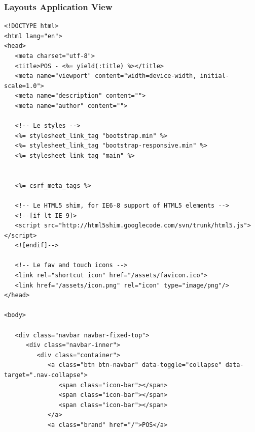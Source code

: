 \documentclass[a4paper]{article}
\begin{document}
\subsubsection{Layouts Application View}
\begin{verbatim}
<!DOCTYPE html>
<html lang="en">
<head>
   <meta charset="utf-8">
   <title>POS - <%= yield(:title) %></title>
   <meta name="viewport" content="width=device-width, initial-scale=1.0">
   <meta name="description" content="">
   <meta name="author" content="">

   <!-- Le styles -->
   <%= stylesheet_link_tag "bootstrap.min" %>
   <%= stylesheet_link_tag "bootstrap-responsive.min" %>
   <%= stylesheet_link_tag "main" %>


   <%= csrf_meta_tags %>

   <!-- Le HTML5 shim, for IE6-8 support of HTML5 elements -->
   <!--[if lt IE 9]>
   <script src="http://html5shim.googlecode.com/svn/trunk/html5.js"></script>
   <![endif]-->

   <!-- Le fav and touch icons -->
   <link rel="shortcut icon" href="/assets/favicon.ico">
   <link href="/assets/icon.png" rel="icon" type="image/png"/>
</head>

<body>

   <div class="navbar navbar-fixed-top">
      <div class="navbar-inner">
         <div class="container">
            <a class="btn btn-navbar" data-toggle="collapse" data-target=".nav-collapse">
               <span class="icon-bar"></span>
               <span class="icon-bar"></span>
               <span class="icon-bar"></span>
            </a>
            <a class="brand" href="/">POS</a>



\end{verbatim}
\end{document}
